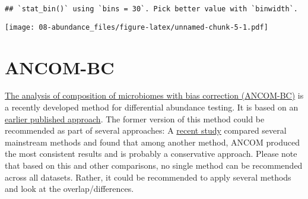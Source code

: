 \documentclass[
  oneside]{book}
\newenvironment{Shaded}{\begin{snugshade}}{\end{snugshade}}
\newcommand{\AttributeTok}[1]{\textcolor[rgb]{0.77,0.63,0.00}{#1}}
\newcommand{\CommentTok}[1]{\textcolor[rgb]{0.56,0.35,0.01}{\textit{#1}}}
\newcommand{\FunctionTok}[1]{\textcolor[rgb]{0.00,0.00,0.00}{#1}}
\newcommand{\NormalTok}[1]{#1}
\newcommand{\OtherTok}[1]{\textcolor[rgb]{0.56,0.35,0.01}{#1}}
\newcommand{\SpecialCharTok}[1]{\textcolor[rgb]{0.00,0.00,0.00}{#1}}
\newcommand{\StringTok}[1]{\textcolor[rgb]{0.31,0.60,0.02}{#1}}
\begin{document}
\begin{Shaded}
\end{Shaded}

\begin{verbatim}
## `stat_bin()` using `bins = 30`. Pick better value with `binwidth`.
\end{verbatim}

\texttt{[image: 08-abundance\_files/figure-latex/unnamed-chunk-5-1.pdf]}

\hypertarget{ancom-bc}{%
\section{ANCOM-BC}\label{ancom-bc}}

\href{https://www.nature.com/articles/s41467-020-17041-7}{The analysis of composition of microbiomes with bias correction (ANCOM-BC)}
is a recently developed method for differential abundance testing. It is based on an
\href{https://www.ncbi.nlm.nih.gov/pmc/articles/PMC4450248/}{earlier published approach}.
The former version of this method could be recommended as part of several approaches:
A \href{https://www.biorxiv.org/content/10.1101/2021.05.10.443486v1.full}{recent study}
compared several mainstream methods and found that among another method, ANCOM produced the most consistent results and is probably a conservative approach. Please note that based on this and other comparisons, no single method can be recommended across all datasets. Rather, it could be recommended to apply several methods and look at the overlap/differences.
\end{document}

